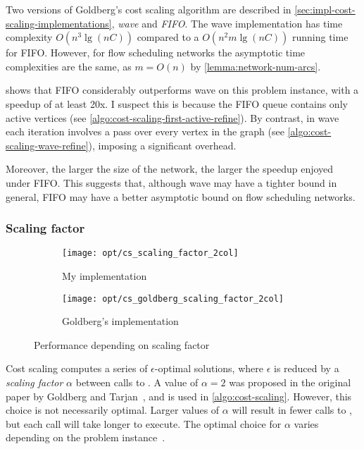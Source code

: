 Two versions of Goldberg's cost scaling algorithm are described in \cref{sec:impl-cost-scaling-implementations}, \emph{wave} and \emph{FIFO}. The wave implementation has time complexity $O\left(n^3 \lg \left(nC\right)\right)$ compared to a $O\left(n^2m\lg\left(nC\right)\right)$ running time for FIFO. However, for flow scheduling networks the asymptotic time complexities are the same, as $m = O(n)$ by \cref{lemma:network-num-arcs}. 

 shows that FIFO considerably outperforms wave on this problem instance, with a speedup of at least 20x. I suspect this is because the FIFO queue contains only active vertices (see \cref{algo:cost-scaling-first-active-refine}). By contrast, in wave each iteration involves a pass over every vertex in the graph (see \cref{algo:cost-scaling-wave-refine}), imposing a significant overhead.

Moreover, the larger the size of the network, the larger the speedup enjoyed under FIFO. This suggests that, although wave may have a tighter bound in general, FIFO may have a better asymptotic bound on flow scheduling networks.


\subsubsection{Scaling factor}

\begin{figure}
    \begin{widepage}
    \begin{subfigure}[c]{0.5\textwidth}
        \texttt{[image: opt/cs\_scaling\_factor\_2col]}
        \caption{My implementation}
    \end{subfigure}
    \begin{subfigure}[c]{0.5\textwidth}
        \texttt{[image: opt/cs\_goldberg\_scaling\_factor\_2col]}
        \caption{Goldberg's implementation}
    \end{subfigure}
    \end{widepage}
    \caption{Performance depending on scaling factor}
    \label{fig:opt-cs-scaling-factor}
\end{figure}

Cost scaling computes a series of $\epsilon$-optimal solutions, where $\epsilon$ is reduced by a \emph{scaling factor} $\alpha$ between calls to . A value of $\alpha=2$ was proposed in the original paper by Goldberg and Tarjan~\cite{Goldberg:1987}, and is used in \cref{algo:cost-scaling}. However, this choice is not necessarily optimal. Larger values of $\alpha$ will result in fewer calls to , but each call will take longer to execute. The optimal choice for $\alpha$ varies depending on the problem instance~\cite[\S7]{Goldberg:1997}.

